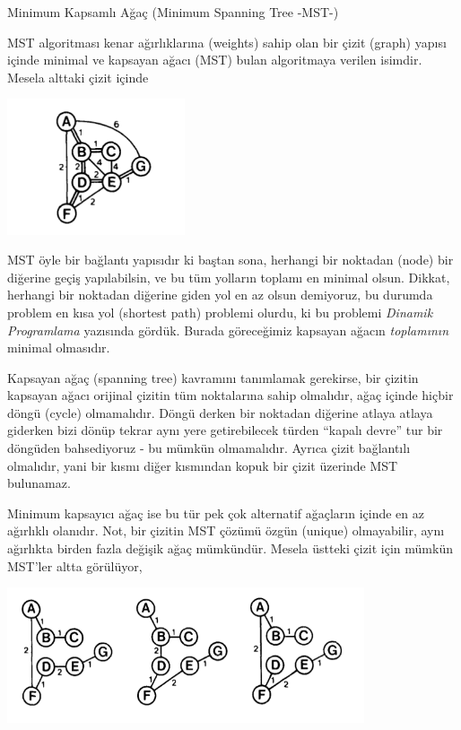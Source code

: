 \documentclass[12pt,fleqn]{article}\usepackage{../../common}
\begin{document}
Minimum Kapsamlı Ağaç (Minimum Spanning Tree -MST-)

MST algoritması kenar ağırlıklarına (weights) sahip olan bir çizit (graph)
yapısı içinde minimal ve kapsayan ağacı (MST) bulan algoritmaya verilen
isimdir. Mesela alttaki çizit içinde

\includegraphics[height=4cm]{minspan_0.png}

MST öyle bir bağlantı yapısıdır ki baştan sona, herhangi bir noktadan
(node) bir diğerine geçiş yapılabilsin, ve bu tüm yolların toplamı en
minimal olsun. Dikkat, herhangi bir noktadan diğerine giden yol en az olsun
demiyoruz, bu durumda problem en kısa yol (shortest path) problemi
olurdu, ki bu problemi {\em Dinamik Programlama} yazısında gördük. Burada
göreceğimiz kapsayan ağacın {\em toplamının} minimal olmasıdır. 

Kapsayan ağaç (spanning tree) kavramını tanımlamak gerekirse, bir çizitin
kapsayan ağacı orijinal çizitin tüm noktalarına sahip olmalıdır, ağaç
içinde hiçbir döngü (cycle) olmamalıdır. Döngü derken bir noktadan diğerine
atlaya atlaya giderken bizi dönüp tekrar aynı yere getirebilecek türden
``kapalı devre'' tur bir döngüden bahsediyoruz - bu mümkün
olmamalıdır. Ayrıca çizit bağlantılı olmalıdır, yani bir kısmı diğer
kısmından kopuk bir çizit üzerinde MST bulunamaz. 

Minimum kapsayıcı ağaç ise bu tür pek çok alternatif ağaçların içinde en az
ağırlıklı olanıdır. Not, bir çizitin MST çözümü özgün (unique) olmayabilir, aynı
ağırlıkta birden fazla değişik ağaç mümkündür. Mesela üstteki çizit için mümkün
MST'ler altta görülüyor,

\includegraphics[height=4cm]{minspan_1.png}
\end{document}
